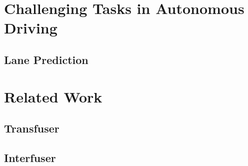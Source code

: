 \section{Challenging Tasks in Autonomous Driving}

\subsection{Lane Prediction}


\section{Related Work}

\subsection{Transfuser}

\subsection{Interfuser}
